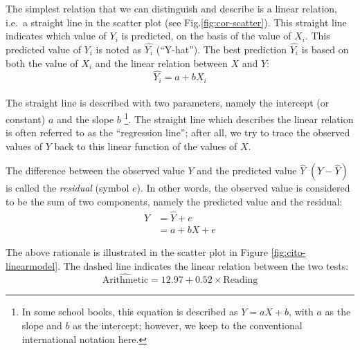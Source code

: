 \documentclass[
]{book}
\begin{document}
The simplest relation that we can distinguish and describe is a linear
relation, i.e.~a straight line in the scatter plot
(see Fig.\ref{fig:cor-scatter}). This straight line indicates which value
of \(Y_i\) is predicted, on the basis of the value of \(X_i\). This predicted value of
\(Y_i\) is noted as \(\widehat{Y_i}\)
(``Y-hat''). The best prediction \(\widehat{Y_i}\) is based on both the value
of \(X_i\) and the linear relation between \(X\) and \(Y\):
\begin{equation}
    \widehat{Y_i} = a + b {X_i} 
  \label{eq:linearmodel2}
\end{equation}\\
The straight line is described with
two parameters, namely the intercept (or constant) \(a\) and the slope \(b\)
\footnote{In some school books, this equation is described as \(Y = a X + b\), with \(a\) as the slope and \(b\) as the intercept; however, we keep to the conventional international notation here.}. The straight line which describes the linear relation is often
referred to as the ``regression line'';
after all, we try to trace the observed values of \(Y\) back to this linear
function of the values of \(X\).

The difference between the observed value \(Y\) and the predicted value
\(\widehat{Y}\) \((Y-\widehat{Y})\) is called the \emph{residual} (symbol
\(e\)). In other words, the observed value is considered to be
the sum of two components, namely the predicted value and the residual:
\begin{align}
    Y   &= \widehat{Y} + e \\
        &= a + b X + e 
  \label{eq:linearmodel3}
\end{align}

The above rationale is illustrated in the scatter plot in
Figure \ref{fig:cito-linearmodel}. The dashed line indicates the linear relation
between the two tests:
\begin{equation}
    \widehat{\textrm{Arithmetic}} = 12.97 + 0.52 \times \textrm{Reading}
  \label{eq:cito-linearmodel}
\end{equation}
\end{document}
